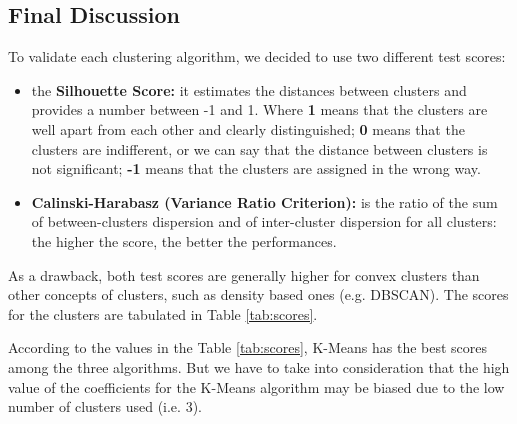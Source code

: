 \documentclass[a4paper,11pt,dvipsnames]{article}
\begin{document}
\subsection{Final Discussion}

To validate each clustering algorithm, we decided to use two different test scores:
\begin{itemize}
    \item the \textbf{Silhouette Score:} it estimates the distances between clusters and provides a number between -1 and 1. Where \textbf{1} means that the clusters are well apart from each other and clearly distinguished; \textbf{0} means that the clusters are indifferent, or we can say that the distance between clusters is not significant; \textbf{-1} means that the clusters are assigned in the wrong way.
    \item \textbf{Calinski-Harabasz (Variance Ratio Criterion):} is the ratio of the sum of between-clusters dispersion and of inter-cluster dispersion for all clusters: the higher the score, the better the performances.
\end{itemize}

As a drawback, both test scores are generally higher for convex clusters than other concepts of clusters, such as density based ones (e.g. DBSCAN). The scores for the clusters are tabulated in Table \ref{tab:scores}.

\begin{table}[h]
    \centering
    \caption{Evaluation of different test scores for the type of analyzed cluster algorithms}
    \label{tab:scores}
\end{table}

According to the values in the Table \ref{tab:scores}, K-Means has the best scores among the three algorithms. But we have to take into consideration that the high value of the coefficients for the K-Means algorithm may be biased due to the low number of clusters used (i.e. 3).
\end{document}
